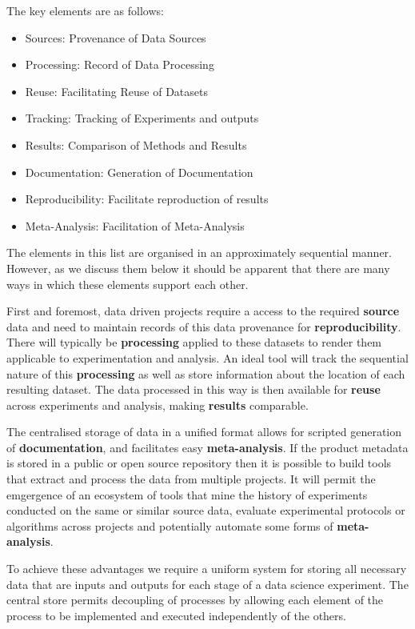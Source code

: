 \documentclass[sigconf]{acmart}
\begin{document}
The key elements are as follows:

\begin{itemize}
 \item Sources: Provenance of Data Sources
 \item Processing: Record of Data Processing
 \item Reuse: Facilitating Reuse of Datasets
 \item Tracking: Tracking of Experiments and outputs
 \item Results: Comparison of Methods and Results
 \item Documentation: Generation of Documentation
 \item Reproducibility: Facilitate reproduction of results
 \item Meta-Analysis: Facilitation of Meta-Analysis
\end{itemize}

The elements in this list are organised in an approximately sequential manner. However, as we discuss
them below it should be apparent that there are many ways in which these elements support each other.

First and foremost, data driven projects require a access to the required \textbf{source} data 
and need to maintain records of this data provenance for \textbf{reproducibility}. 
There will typically be \textbf{processing} applied to these datasets to 
render them applicable to experimentation and analysis. An ideal tool will track the sequential 
nature of this \textbf{processing} as well as store information about the location of each resulting dataset.
The data processed in this way is then available for \textbf{reuse} across experiments and analysis,
making \textbf{results} comparable.

The centralised storage of data in a unified format allows for scripted generation of \textbf{documentation},
and facilitates easy \textbf{meta-analysis}. If the product metadata is stored in a public or open source
repository then it is possible to build tools that extract and process the data from multiple projects. It
will permit the emgergence of an ecosystem of tools that mine the history of experiments conducted on the
same or similar source data, evaluate experimental protocols or algorithms across projects and potentially
automate some forms of \textbf{meta-analysis}.
 
To achieve these advantages we require a uniform system for storing all necessary data that are inputs and outputs 
for each stage of a data science experiment. The central store permits decoupling of processes by allowing each
element of the process to be implemented and executed independently of the others.
\end{document}
